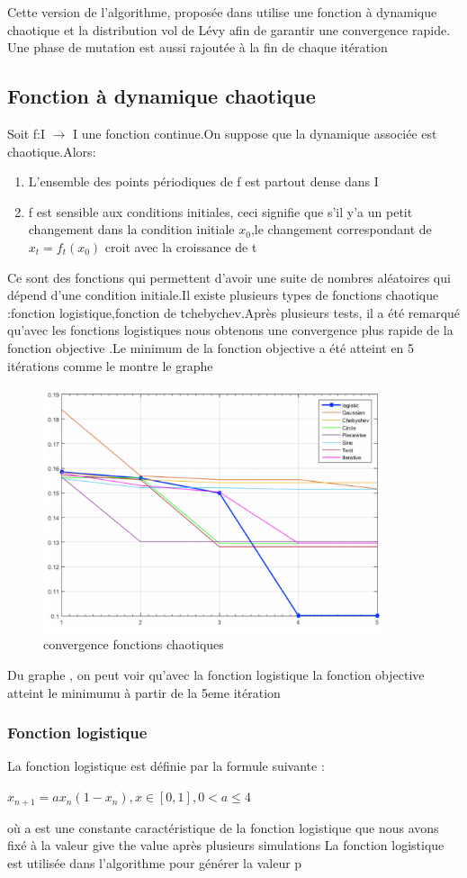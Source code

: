 \documentclass[12pt]{article}
\begin{document}
    Cette version de l'algorithme, proposée dans \cite{abdel2018improved} utilise une fonction à dynamique chaotique et la distribution vol de Lévy afin de garantir une convergence rapide. Une phase de mutation est aussi rajoutée à la fin de chaque itération 
\subsection{Fonction à dynamique chaotique}
Soit f:I $\rightarrow$ I une fonction continue.On suppose que la dynamique associée est chaotique.Alors:
\begin{enumerate}
    \item L'ensemble des points périodiques de f est partout dense dans I 
    \item f est sensible aux conditions initiales, ceci signifie que s'il y'a un petit changement dans la condition initiale $x_0$,le changement correspondant de $x_t=f_t(x_0)$ croit avec la croissance de t 
\end{enumerate}
Ce sont des fonctions qui permettent d'avoir une suite de nombres aléatoires qui dépend d'une condition initiale.Il existe plusieurs types de fonctions chaotique :fonction logistique,fonction de tchebychev.Après plusieurs tests, il a été remarqué qu'avec les fonctions logistiques nous obtenons une convergence plus rapide de la fonction objective .Le minimum de la fonction objective a été atteint en 5 itérations comme le montre le graphe
\begin{figure}[H]
   \centering
    \includegraphics[width=10cm]{../figures/logisticvsothers.PNG}
    \caption{convergence fonctions chaotiques \cite{abdel2018improved}}
\end{figure}
Du graphe , on peut voir qu'avec la fonction logistique la fonction objective atteint le minimumu à partir de la 5eme itération
\subsubsection{Fonction logistique}
La fonction logistique est définie par la formule suivante :
\newline
\begin{center}
    $x_{n+1}=ax_n(1-x_n) ,x\in[0,1],0<a\leq4$   
\end{center}
où a est une constante caractéristique de la fonction logistique que nous avons fixé à la valeur give the value après plusieurs simulations
La fonction logistique est utilisée dans l'algorithme pour générer la valeur p
\end{document}

